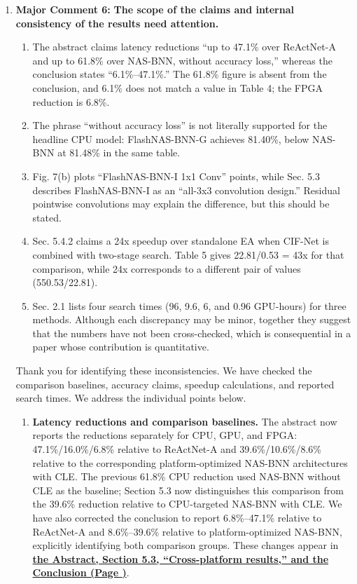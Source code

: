 \documentclass[11pt]{article}
\newcommand{\response}[1]{%
  \Needspace{3\baselineskip}%
  \par\noindent{\color{responseblue}\textbf{Response to #1:}}\par
  \vspace{1mm}\color{responseblue}}
\newcommand{\revloc}[1]{%
  \textcolor{revisionred}{\textbf{\uline{#1}}}}
\begin{document}
\begin{enumerate}[leftmargin=0pt,label={},itemsep=5mm]
\item[]\textbf{Major Comment 6:} \textbf{The scope of the claims and internal consistency of the results need attention.}
\begin{enumerate}[label=(\alph*),leftmargin=2em,itemsep=2mm]
  \item The abstract claims latency reductions ``up to 47.1\% over ReActNet-A and up to 61.8\% over NAS-BNN, without accuracy loss,'' whereas the conclusion states ``6.1\%--47.1\%.'' The 61.8\% figure is absent from the conclusion, and 6.1\% does not match a value in Table 4; the FPGA reduction is 6.8\%.
  \item The phrase ``without accuracy loss'' is not literally supported for the headline CPU model: FlashNAS-BNN-G achieves 81.40\%, below NAS-BNN at 81.48\% in the same table.
  \item Fig. 7(b) plots ``FlashNAS-BNN-I 1x1 Conv'' points, while Sec. 5.3 describes FlashNAS-BNN-I as an ``all-3x3 convolution design.'' Residual pointwise convolutions may explain the difference, but this should be stated.
  \item Sec. 5.4.2 claims a 24x speedup over standalone EA when CIF-Net is combined with two-stage search. Table 5 gives 22.81/0.53 = 43x for that comparison, while 24x corresponds to a different pair of values (550.53/22.81).
  \item Sec. 2.1 lists four search times (96, 9.6, 6, and 0.96 GPU-hours) for three methods. Although each discrepancy may be minor, together they suggest that the numbers have not been cross-checked, which is consequential in a paper whose contribution is quantitative.
\end{enumerate}
\response{Major Comment 6}
\begingroup
\normalfont\color{responseblue}
Thank you for identifying these inconsistencies. We have checked the comparison baselines, accuracy claims, speedup calculations, and reported search times. We address the individual points below.

\begin{enumerate}[label=(\alph*),leftmargin=2em,itemsep=2mm]
\item \textbf{Latency reductions and comparison baselines.} The abstract now reports the reductions separately for CPU, GPU, and FPGA: 47.1\%/16.0\%/6.8\% relative to ReActNet-A and 39.6\%/10.6\%/8.6\% relative to the corresponding platform-optimized NAS-BNN architectures with CLE. The previous 61.8\% CPU reduction used NAS-BNN without CLE as the baseline; Section 5.3 now distinguishes this comparison from the 39.6\% reduction relative to CPU-targeted NAS-BNN with CLE. We have also corrected the conclusion to report 6.8\%--47.1\% relative to ReActNet-A and 8.6\%--39.6\% relative to platform-optimized NAS-BNN, explicitly identifying both comparison groups. These changes appear in \revloc{the Abstract, Section 5.3, ``Cross-platform results,'' and the Conclusion (Page \underline{\hspace{1cm}})}.


\end{enumerate}
\end{enumerate}
\end{document}
